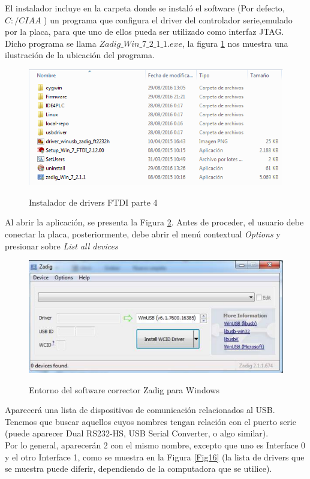 \documentclass[12pt,letterpaper]{article}
\begin{document}
El instalador incluye en la carpeta donde se instaló el software (Por defecto, $ C:/CIAA $ ) un programa que configura el driver del controlador serie,emulado por la placa, para que uno de ellos pueda ser utilizado como interfaz JTAG. Dicho programa se llama $ Zadig\_Win\_7\_2\_1\_1.exe $, la figura \ref{Fig14} nos muestra una ilustración de la ubicación del programa.

\begin{center}
\begin{figure}[!h]
\centering
\includegraphics[width=6 cm]{figuras/instalacion12.png}\\
\caption{Instalador de drivers FTDI parte 4}
\label{Fig14}
\end{figure}
\end{center}

Al abrir la aplicación, se presenta la Figura \ref{Fig15}. Antes de proceder, el usuario debe conectar la placa, posteriormente, debe abrir el menú contextual \textit{Options} y presionar sobre \textit{List all devices}\\

\begin{center}
\begin{figure}[!h]
\centering
\includegraphics[width=6 cm]{figuras/instalacion13.png}\\
\caption{Entorno del software corrector Zadig para Windows}
\label{Fig15}
\end{figure}
\end{center}

Aparecerá una lista de dispositivos de comunicación relacionados al USB. Tenemos que buscar aquellos cuyos nombres tengan relación con el puerto serie (puede aparecer Dual RS232-HS, USB Serial Converter, o algo similar).\\

Por lo general, aparecerán 2 con el mismo nombre, excepto que uno es Interface 0 y el otro Interface 1, como se muestra en la Figura \ref{Fig16} (la lista de drivers que se muestra puede diferir, dependiendo de la computadora que se utilice).
\end{document}
